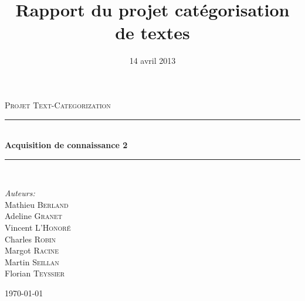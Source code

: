 \documentclass[a4paper]{article}
\title{Rapport du projet catégorisation de textes}
\date{14 avril 2013}
\newcommand{\HRule}{\rule{\linewidth}{0.5mm}}
\begin{document}

\begin{titlepage}

\begin{center}



\textsc{\Large Projet Text-Categorization}\\[0.5cm]


\HRule \\[0.4cm]
{ \huge \bfseries Acquisition de connaissance 2}\\[0.4cm]

\HRule \\[1.5cm]

\begin{minipage}{0.4\textwidth}
\begin{flushleft} \large
\emph{Auteurs:}\\
Mathieu \textsc{Berland}\\
Adeline \textsc{Granet}\\
Vincent \textsc{L'Honoré}\\
Charles \textsc{Robin}\\
Margot \textsc{Racine}\\
Martin \textsc{Seillan}\\
Florian \textsc{Teyssier}\\
\end{flushleft}
\end{minipage}
\begin{minipage}{0.4\textwidth}
\begin{flushright} \large
\end{flushright}
\end{minipage}

\vfill

{\large \today}
\end{center}

\end{titlepage}






\tableofcontents
\newpage


\newpage
\end{document}

